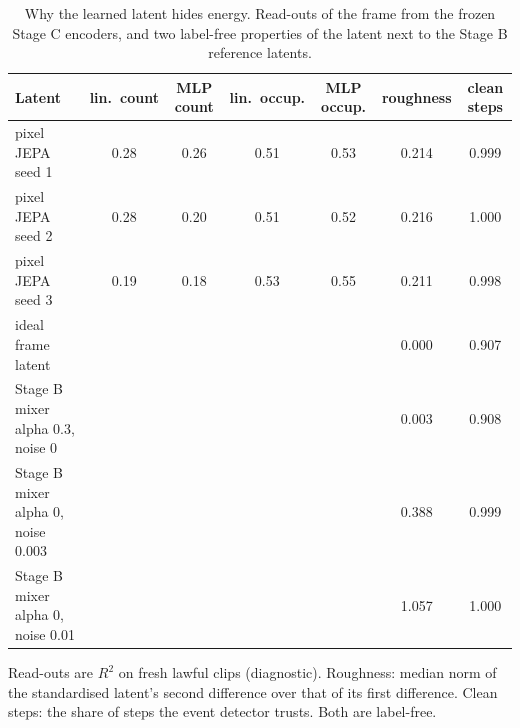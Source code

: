 \begin{table}[t]\centering\small
\caption{Why the learned latent hides energy. Read-outs of the frame from the frozen Stage C encoders, and two label-free properties of the latent next to the Stage B reference latents.}\label{tab:diag}
\begin{tabular}{lcccccc}\toprule
Latent & lin.\ count & MLP count & lin.\ occup. & MLP occup. & roughness & clean steps\\\midrule
pixel JEPA seed 1 & 0.28 & 0.26 & 0.51 & 0.53 & 0.214 & 0.999\\
pixel JEPA seed 2 & 0.28 & 0.20 & 0.51 & 0.52 & 0.216 & 1.000\\
pixel JEPA seed 3 & 0.19 & 0.18 & 0.53 & 0.55 & 0.211 & 0.998\\
\midrule
ideal frame latent & & & & & 0.000 & 0.907\\
Stage B mixer alpha 0.3, noise 0 & & & & & 0.003 & 0.908\\
Stage B mixer alpha 0, noise 0.003 & & & & & 0.388 & 0.999\\
Stage B mixer alpha 0, noise 0.01 & & & & & 1.057 & 1.000\\
\bottomrule\end{tabular}
\par\smallskip\footnotesize Read-outs are $R^2$ on fresh lawful clips (diagnostic). Roughness: median norm of the standardised latent's second difference over that of its first difference. Clean steps: the share of steps the event detector trusts. Both are label-free.
\end{table}
